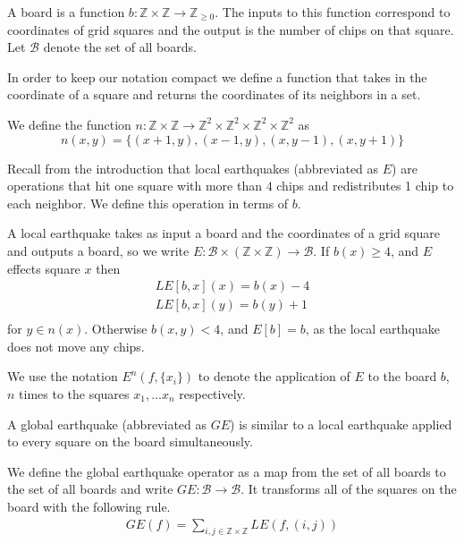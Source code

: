 \documentclass[runningheads,a4paper]{llncs}
\begin{document}
\begin{definition} A board is a function $b: \mathbb{Z} \times \mathbb{Z} \to \mathbb{Z}_{\geq 0}$.
The inputs to this function correspond to coordinates of grid squares and the output is the number of chips on that square. Let $\mathcal{B}$ denote the set of all boards.
\end{definition}

In order to keep our notation compact we define a function that takes in the coordinate of a square and returns the coordinates of its neighbors in a set. 
\begin{definition}
We define the function $n: \mathbb{Z} \times \mathbb{Z} \rightarrow \mathbb{Z}^2 \times \mathbb{Z}^2 \times \mathbb{Z}^2 \times \mathbb{Z}^2 $ as 
\begin{equation}
n(x,y) = \{ (x+1, y), (x-1, y), (x, y-1), (x, y+1) \}
\end{equation}
\end{definition}

Recall from the introduction that local earthquakes (abbreviated as $E$) are operations that hit one square with more than $4$ chips and redistributes 1 chip to each neighbor. We define this operation in terms of $b$.

\begin{definition}
A local earthquake takes as input a board and the coordinates of a grid square and outputs a board, so we write $E: \mathcal{B} \times (\mathbb{Z} \times \mathbb{Z}) \rightarrow \mathcal{B}$. If $b(x) \geq 4$, and $E$ effects square $x$ then 
\begin{align*}
LE[ b, x](x) = b(x)-4 \\
LE[ b, x](y) = b(y)+1 \\
\end{align*}
for $ y \in n(x)$. Otherwise  $b(x,y) < 4$, and $E[b] = b$, as the local earthquake does not move any chips.
\end{definition}
We use the notation $E^n(f, \{x_i\})$ to denote the application of $E$ to the board $b$, $n$ times to the squares $x_1, \ldots x_{n}$ respectively. 

A global earthquake (abbreviated as $GE$) is similar to a local earthquake applied to every square on the board simultaneously.

\begin{definition} We define the global earthquake operator as a map from the set of all boards to the set of all boards and write $GE: \mathcal{B} \rightarrow \mathcal{B}$. 
It transforms all of the squares on the board with the following rule.
\begin{align*}
GE(f) = \sum_{i, j \in \mathbb{Z}\times \mathbb{Z}} LE(f, (i,j))
\end{align*}
\end{definition}
\end{document}
